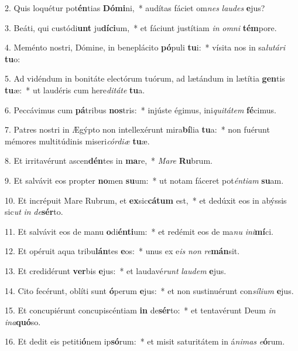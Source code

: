 2. Quis loquétur pot\textbf{én}tias \textbf{Dó}\textbf{mi}ni,~*  audítas fáciet om\textit{nes} \textit{lau}\textit{des} \textbf{e}jus?\

3. Beáti, qui custódi\textbf{unt} ju\textbf{dí}\textbf{ci}um,~*  et fáciunt justítiam \textit{in} \textit{om}\textit{ni} \textbf{tém}pore.\

4. Meménto nostri, Dómine, in beneplácito \textbf{pó}puli \textbf{tu}i:~*  vísita nos in sa\textit{lu}\textit{tá}\textit{ri} \textbf{tu}o:\

5. Ad vidéndum in bonitáte electórum tuórum, ad lætándum in lætítia \textbf{gen}tis \textbf{tu}æ:~*  ut laudéris cum here\textit{di}\textit{tá}\textit{te} \textbf{tu}a.\

6. Peccávimus cum \textbf{pá}tribus \textbf{nos}tris:~*  injúste égimus, ini\textit{qui}\textit{tá}\textit{tem} \textbf{fé}cimus.\

7. Patres nostri in Ægýpto non intellexérunt mira\textbf{bí}lia \textbf{tu}a:~*  non fuérunt mémores multitúdinis miseri\textit{cór}\textit{di}\textit{æ} \textbf{tu}æ.\

8. Et irritavérunt ascen\textbf{dén}tes in \textbf{ma}re,~*  \textit{Ma}\textit{re} \textbf{Ru}brum.\

9. Et salvávit eos propter \textbf{no}men \textbf{su}um:~*  ut notam fáceret pot\textit{én}\textit{ti}\textit{am} \textbf{su}am.\

10. Et incrépuit Mare Rubrum, et \textbf{ex}sic\textbf{cá}\textbf{tum} est,~*  et dedúxit eos in abýssis sic\textit{ut} \textit{in} \textit{de}\textbf{sér}to.\

11. Et salvávit eos de manu \textbf{o}di\textbf{én}\textbf{ti}um:~*  et redémit eos de ma\textit{nu} \textit{in}\textit{i}\textbf{mí}ci.\

12. Et opéruit aqua tribu\textbf{lán}tes \textbf{e}os:~*  unus ex e\textit{is} \textit{non} \textit{re}\textbf{mán}sit.\

13. Et credidérunt \textbf{ver}bis \textbf{e}jus:~*  et laudavé\textit{runt} \textit{lau}\textit{dem} \textbf{e}jus.\

14. Cito fecérunt, oblíti sunt \textbf{ó}perum \textbf{e}jus:~*  et non sustinuérunt con\textit{sí}\textit{li}\textit{um} \textbf{e}jus.\

15. Et concupiérunt concupiscéntiam \textbf{in} de\textbf{sér}to:~*  et tentavérunt Deum \textit{in} \textit{in}\textit{a}\textbf{quó}so.\

16. Et dedit eis petiti\textbf{ó}nem ip\textbf{só}rum:~*  et misit saturitátem in á\textit{ni}\textit{mas} \textit{e}\textbf{ó}rum.\

